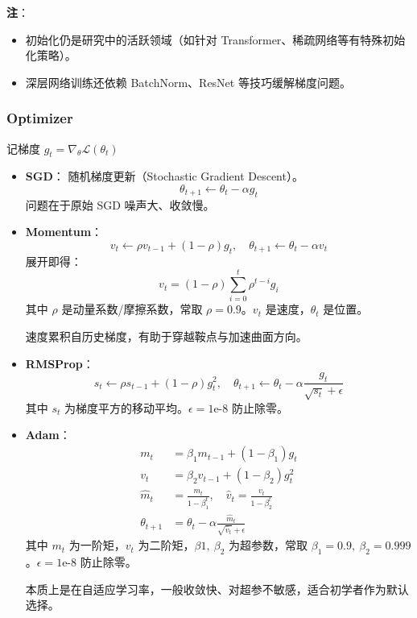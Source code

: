 \textbf{注}：

\begin{itemize}
\tightlist
\item
  初始化仍是研究中的活跃领域（如针对
  Transformer、稀疏网络等有特殊初始化策略）。
\item
  深层网络训练还依赖 BatchNorm、ResNet 等技巧缓解梯度问题。
\end{itemize}

\subsubsection{Optimizer}\label{optimizer}

记梯度 \(g_t = \nabla_\theta \mathcal{L}(\theta_t)\)

\begin{itemize}
\item
  \textbf{SGD}： 随机梯度更新（Stochastic Gradient Descent）。 \[
    \theta_{t+1} \leftarrow \theta_t - \alpha g_t
    \] 问题在于原始 SGD 噪声大、收敛慢。
\item
  \textbf{Momentum}： \[
    v_t \leftarrow \rho v_{t-1} + (1 - \rho) g_t,\quad
    \theta_{t+1} \leftarrow \theta_t - \alpha v_t
    \] 展开即得： \[
    v_t = (1 - \rho) \sum_{i = 0}^t \rho^{t-i} g_i
    \] 其中 \(\rho\) 是动量系数/摩擦系数，常取 \(\rho = 0.9\)。\(v_t\)
  是速度，\(\theta_t\) 是位置。

  速度累积自历史梯度，有助于穿越鞍点与加速曲面方向。
\item
  \textbf{RMSProp}： \[
    s_t \leftarrow \rho s_{t-1} + (1-\rho)g_t^2,\quad
    \theta_{t+1} \leftarrow \theta_t - \alpha \frac{g_t}{\sqrt{s_t} + \epsilon}
    \] 其中 \(s_t\) 为梯度平方的移动平均。\(\epsilon = \text{1e-8}\)
  防止除零。
\item
  \textbf{Adam}： \[
    \begin{aligned}
    m_t &= \beta_1 m_{t-1} + (1-\beta_1) g_t \\
    v_t &= \beta_2 v_{t-1} + (1-\beta_2) g_t^2 \\
    \hat m_t &= \frac{m_t}{1-\beta_1^t},\quad \hat v_t = \frac{v_t}{1-\beta_2^t} \\
    \theta_{t+1} &= \theta_t - \alpha \frac{\hat m_t}{\sqrt{\hat v_t} + \epsilon}
    \end{aligned}
    \] 其中 \(m_t\) 为一阶矩，\(v_t\) 为二阶矩，\(\beta1,\ \beta_2\)
  为超参数，常取
  \(\beta_1 = 0.9,\ \beta_2 = 0.999\)。\(\epsilon = \text{1e-8}\)
  防止除零。

  本质上是在自适应学习率，一般收敛快、对超参不敏感，适合初学者作为默认选择。
\end{itemize}

